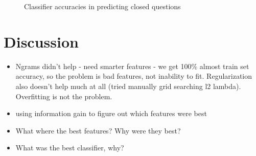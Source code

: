 \documentclass[11pt]{article}
\begin{document}
\begin{figure}
\centering
{}
\caption{Classifier accuracies in predicting closed questions}
\label{fig:results}
\end{figure}

\section{Discussion}

\begin{itemize}
  \item Ngrams didn’t help - need smarter features - we get 100\%
    almost train set accuracy, so the problem is bad features, not
    inability to fit. Regularization also doesn’t help much at all
    (tried manually grid searching l2 lambda). Overfitting is not the
    problem.
  \item using information gain to figure out which features were best
  \item What where the best features? Why were they best?
  \item What was the best classifier, why?
\end{itemize}
\end{document}
